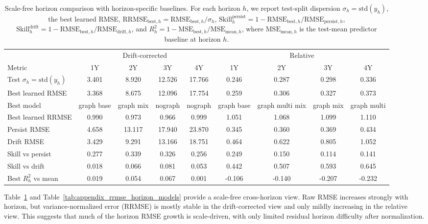\documentclass{article}
\begin{document}
\begin{table}[H]
\centering
\caption{Scale-free horizon comparison with horizon-specific baselines. For each horizon $h$, we report test-split dispersion $\sigma_h=\mathrm{std}(y_h)$, the best learned RMSE, $\mathrm{RRMSE}_{\mathrm{best},h}=\mathrm{RMSE}_{\mathrm{best},h}/\sigma_h$, $\mathrm{Skill}^{\mathrm{persist}}_h=1-\mathrm{RMSE}_{\mathrm{best},h}/\mathrm{RMSE}_{\mathrm{persist},h}$, $\mathrm{Skill}^{\mathrm{drift}}_h=1-\mathrm{RMSE}_{\mathrm{best},h}/\mathrm{RMSE}_{\mathrm{drift},h}$, and $R_h^2=1-\mathrm{MSE}_{\mathrm{best},h}/\mathrm{MSE}_{\mathrm{mean},h}$, where $\mathrm{MSE}_{\mathrm{mean},h}$ is the test-mean predictor baseline at horizon $h$.}
\label{tab:appendix_scale_free_horizon}
\small
\setlength{\tabcolsep}{4pt}
\begin{tabular}{lcccccccc}
\toprule
& \multicolumn{4}{c}{Drift-corrected} & \multicolumn{4}{c}{Relative} \\
Metric & 1Y & 2Y & 3Y & 4Y & 1Y & 2Y & 3Y & 4Y \\
\midrule
Test $\sigma_h=\mathrm{std}(y_h)$ & 3.401 & 8.920 & 12.526 & 17.766 & 0.246 & 0.287 & 0.298 & 0.336 \\
Best learned RMSE & 3.368 & 8.675 & 12.096 & 17.754 & 0.259 & 0.306 & 0.327 & 0.373 \\
Best model & graph base & graph mix & nograph & nograph & graph base & graph multi mix & graph mix & graph multi \\
Best learned RRMSE & 0.990 & 0.973 & 0.966 & 0.999 & 1.051 & 1.068 & 1.099 & 1.110 \\
Persist RMSE & 4.658 & 13.117 & 17.940 & 23.870 & 0.345 & 0.360 & 0.369 & 0.434 \\
Drift RMSE & 3.429 & 9.291 & 13.166 & 18.751 & 0.464 & 0.622 & 0.805 & 1.052 \\
Skill vs persist & 0.277 & 0.339 & 0.326 & 0.256 & 0.249 & 0.150 & 0.114 & 0.141 \\
Skill vs drift & 0.018 & 0.066 & 0.081 & 0.053 & 0.442 & 0.507 & 0.593 & 0.645 \\
Best $R_h^2$ vs mean & 0.019 & 0.054 & 0.067 & 0.001 & -0.106 & -0.140 & -0.207 & -0.232 \\
\bottomrule
\end{tabular}
\end{table}

Table~\ref{tab:appendix_scale_free_horizon} and Table~\ref{tab:appendix_rrmse_horizon_models} provide a scale-free cross-horizon view. Raw RMSE increases strongly with horizon, but variance-normalized error (RRMSE) is mostly stable in the drift-corrected view and only mildly increasing in the relative view. This suggests that much of the horizon RMSE growth is scale-driven, with only limited residual horizon difficulty after normalization.
\end{document}

